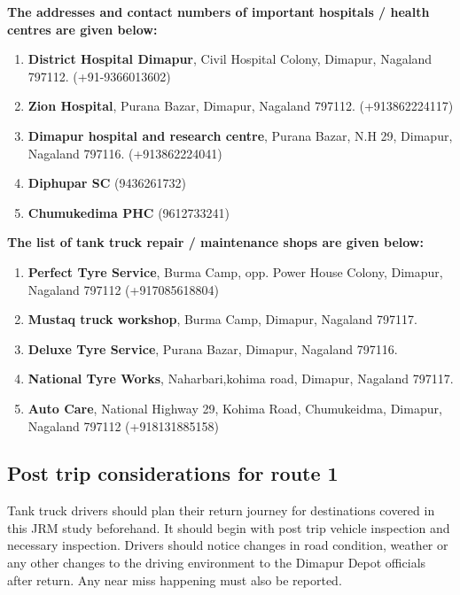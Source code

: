 \documentclass[paper=letter, fontsize=12pt]{article}
\begin{document}
\textbf{The addresses and contact numbers of important hospitals / health centres are given below:}

\begin{enumerate}
    \item \textbf{District Hospital Dimapur}, Civil Hospital Colony, Dimapur, Nagaland 797112. (+91-9366013602)
    
    \item \textbf{Zion Hospital}, Purana Bazar, Dimapur, Nagaland 797112. (+913862224117)
    
    \item \textbf{Dimapur hospital and research centre}, Purana Bazar, N.H 29, Dimapur, Nagaland 797116. (+913862224041)
    
    \item \textbf{Diphupar SC} (9436261732)
    
    \item \textbf{Chumukedima PHC} (9612733241)
    
    
\end{enumerate}

\textbf{The list of tank truck repair / maintenance shops are given below:}

\begin{enumerate}
    \item \textbf{Perfect Tyre Service}, Burma Camp, opp. Power House Colony, Dimapur, Nagaland 797112 (+917085618804)
    \item \textbf{Mustaq truck workshop}, Burma Camp, Dimapur, Nagaland 797117.
    \item \textbf{Deluxe Tyre Service}, Purana Bazar, Dimapur, Nagaland 797116.
    \item \textbf{National Tyre Works}, Naharbari,kohima road, Dimapur, Nagaland 797117.
    \item \textbf{Auto Care}, National Highway 29, Kohima Road, Chumukeidma, Dimapur, Nagaland 797112 (+918131885158)
\end{enumerate}



\subsection{Post trip considerations for route 1}

Tank truck drivers should plan their return journey for destinations covered in this JRM study beforehand. It should begin with post trip vehicle inspection and necessary inspection. Drivers should notice changes in road condition, weather or any other changes to the driving environment to the Dimapur Depot officials after return. Any near miss happening must also be reported.
\end{document}
